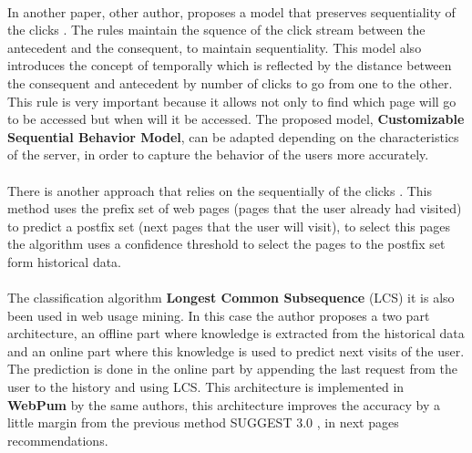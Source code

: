 \paragraph{}

In another paper, other author, proposes a model that preserves sequentiality of
the clicks \cite{Frias-Martinez2003}. The rules maintain the squence of the
click stream between the antecedent and the consequent, to maintain sequentiality.
This model also introduces the concept of temporally which is reflected by the
distance between the consequent and antecedent by number of clicks to go from one
to the other. This rule is very important because it allows not only to find
which page will go to be accessed but when will it be accessed. The proposed
model, \textbf{Customizable Sequential Behavior Model}, can be adapted depending
on the characteristics of the server, in order to capture the behavior of the
users more accurately.

\paragraph{}

There is another approach that relies on the sequentially of the clicks
\cite{Jan:2007:WUB:1353862.1353874}.
This method uses the prefix set of web pages (pages that the user already had
visited) to predict a postfix set (next pages that the user will visit), to
select this pages the algorithm uses a confidence threshold to select the pages
to the postfix set form historical data.

\paragraph{}

The classification algorithm \textbf{Longest Common Subsequence} (LCS)
\cite{4631852} it is also been used in web usage mining. In this case the author
proposes a two part architecture, an offline part where knowledge is extracted
from the historical data and an online part where this knowledge is used to
predict next visits of the user. The prediction is done in the online part by
appending the last request from the user to the history and using LCS. This
architecture is implemented in \textbf{WebPum} \cite{Jalali20106201} by the same
authors, this architecture improves the accuracy by a little margin from the
previous method SUGGEST 3.0 \cite{1410804}, in next pages recommendations.

\paragraph{}

